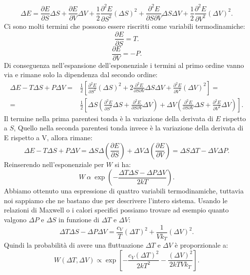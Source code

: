 \[
	\Delta E = \frac{\partial E}{\partial S} \Delta S  
	+ \frac{\partial E}{\partial V} \Delta V 
	+ \frac{1}{2} \frac{\partial ^2 E}{\partial S^2} \left( \Delta S \right) ^2 
	+ \frac{\partial ^2 E}{\partial S \partial V} \Delta S \Delta V
	+  \frac{1}{2} \frac{\partial ^2E}{\partial V^2} \left( \Delta V \right) ^2 
.\] 
Ci sono molti termini che possono essere riscritti come variabili termodinamiche: 
\[
	\frac{\partial E}{\partial S} = T
.\] 
\[
	\frac{\partial E}{\partial V} = -P
.\] 
Di conseguenza nell'espansione dell'esponenziale i termini al primo ordine vanno via e rimane solo la dipendenza dal secondo ordine:
\begin{align}
	\Delta E - T \Delta S + P \Delta V = &
	\frac{1}{2}\left[
		\frac{\partial ^2 E }{\partial S^2} \left( \Delta S \right) ^2 +
		2 \frac{\partial ^2 E}{\partial S \partial V} \Delta S \Delta V  +
		\frac{\partial ^2 E}{\partial V^2} \left( \Delta V \right) ^2
	\right] =\\
	=&\frac{1}{2}\left[ 
		\Delta S \left( 
			\frac{\partial ^2E}{\partial S^2} \Delta S +
			\frac{\partial ^2E}{\partial S \partial V}\Delta V  
		\right) 
		+ \Delta V \left( 
			\frac{\partial ^2 E}{\partial S \partial V} \Delta S + 
			\frac{\partial ^2 E }{\partial V^2} \Delta V 
		\right) 
	\right] 
.\end{align}
Il termine nella prima parentesi tonda è la variazione della derivata di $E$ rispetto a  $S$, Quello nella seconda parentesi tonda invece è la variazione della derivata di E rispetto a V, allora rimane:
\[
	\Delta E - T \Delta S + P \Delta V = 
	\Delta S \Delta\left( \frac{\partial E}{\partial S}  \right) + \Delta V \Delta \left( \frac{\partial E}{\partial V}  \right) =
	\Delta S \Delta T - \Delta V \Delta P
.\] 
Reinserendo nell'esponenziale per $W$ si ha:
\[
	W \ \alpha \ \exp\left( -\frac{\Delta T \Delta S - \Delta P \Delta V}{2kT} \right) 
.\] 
Abbiamo ottenuto una espressione di quattro variabili termodinamiche, tuttavia noi sappiamo che ne bastano due per descrivere l'intero sistema. Usando le relazioni di Maxwell o i calori specifici possiamo trovare ad esempio quanto valgono $\Delta P$ e $\Delta S$ in funzione di $\Delta T$ e $\Delta V$:
\[
	\Delta T \Delta S - \Delta P \Delta V = 
	\frac{c_{V}}{T}\left( \Delta T \right) ^2 + \frac{1}{Vk_{T}}\left( \Delta V \right) ^2
.\] 
Quindi la probabilità di avere una fluttuazione $\Delta T$ e $\Delta V$ è proporzionale a: 
\[
	W\left( \Delta T, \Delta V \right) \propto \exp\left[ -\frac{c_{V} \left( \Delta T \right)^2 }{2kT^2}- \frac{\left( \Delta V \right) ^2}{2kTVk_{T}} \right]
.\] 
